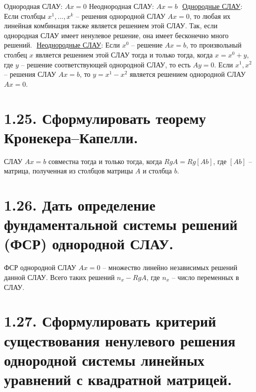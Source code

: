 \documentclass{article}
\begin{document}
Однородная СЛАУ: $Ax = 0$
\newline Неоднородная СЛАУ: $Ax = b$
\newline $ $
\newline \underline{Однородные СЛАУ}:
\newline Если столбцы $x^1, ..., x^k$ -- решения однородной СЛАУ $Ax = 0$, то любая их линейная комбинация также является решением этой СЛАУ. Так, если однородная СЛАУ имеет ненулевое решение, она имеет бесконечно много решений.
\newline $ $
\newline \underline{Неоднородные СЛАУ}:
\newline Если $x^0$ -- решение $Ax = b$, то произвольный столбец $x$ является решением этой СЛАУ тогда и только тогда, когда $x = x^0 + y$, где $y$ -- решение соответствующей однородной СЛАУ, то есть $Ay = 0$.
\newline Если $x^1, x^2$ -- решения СЛАУ $Ax = b$, то $y = x^1 - x^2$ является решением однородной СЛАУ $Ax = 0$.

\section*{\LARGE 1.25. Сформулировать теорему Кронекера–Капелли.  }

СЛАУ $Ax = b$ совместна тогда и только тогда, когда $RgA = Rg[Ab]$, где $[Ab]$ -- матрица, полученная из столбцов матрицы $A$ и столбца $b$. 

\section*{\LARGE 1.26. Дать определение фундаментальной системы решений (ФСР) однородной СЛАУ. }

ФСР однородной СЛАУ $Ax = 0$ -- множество линейно независимых решений данной СЛАУ. Всего таких решений $n_x -  RgA$, где $n_x$ -- число переменных в СЛАУ.

\section*{\LARGE 1.27. Сформулировать критерий существования ненулевого решения однородной системы линейных уравнений с квадратной матрицей. }
\end{document}
